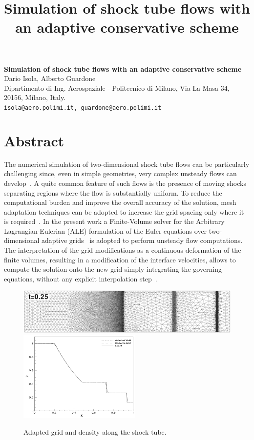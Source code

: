 \title{Simulation of shock tube flows with an adaptive conservative scheme}
\author{} \institute{}

\begin{center}

\textbf{\Large Simulation of shock tube flows with an adaptive conservative scheme}\\
\vspace{10mm}
{\large Dario Isola, Alberto Guardone}\\
Dipartimento di Ing. Aerospaziale - Politecnico di Milano, Via La Masa 34, 20156, Milano, Italy. \\
{\tt isola@aero.polimi.it, guardone@aero.polimi.it}

\end{center}

\section*{Abstract}

The numerical simulation of two-dimensional shock tube flows can be particularly challenging since, even in simple geometries, very complex unsteady flows can develop~\cite{Woodward-Colella-1984}. A quite common feature of such flows is the presence of moving shocks separating regions where the flow is substantially uniform. To reduce the computational burden and improve the overall accuracy of the solution, mesh adaptation techniques can be adopted to increase the grid spacing only where it is required~\cite{Naderi-Darbandi-Rahni-2010}.  In the present work a Finite-Volume solver for the Arbitrary Lagrangian-Eulerian (ALE) formulation of the Euler equations over two-dimensional adaptive grids~\cite{Forestieri-Isola-Marulli-Guardone-Quaranta-2010} is adopted to perform unsteady flow computations. The interpretation of the grid modifications as a continuous deformation of the finite volumes, resulting in a modification of the interface velocities, allows to compute the solution onto the new grid simply integrating the governing equations, without any explicit interpolation step~\cite{Isola-Guardone-Quaranta-2010}.

\begin{figure}

\centering
\includegraphics[height=.16\textwidth]{./isola/grid.png}
\includegraphics[height=.16\textwidth]{./isola/solution.png}
\caption{Adapted grid and density along the shock tube.}

\end{figure}

